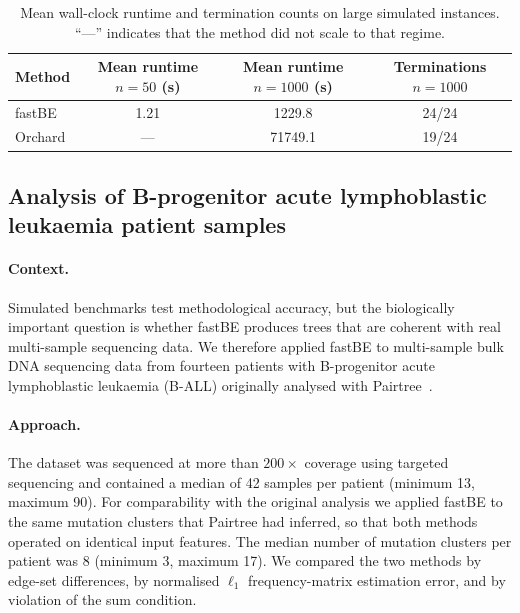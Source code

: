 \documentclass[11pt]{article}
\begin{document}
\begin{table}[htbp]
\centering
\caption{Mean wall-clock runtime and termination counts on large simulated instances. ``---'' indicates that the method did not scale to that regime.}
\label{tab:sim_runtime}
\begin{tabular}{lccc}
\toprule
Method & Mean runtime $n=50$ (s) & Mean runtime $n=1000$ (s) & Terminations $n=1000$ \\
\midrule
fastBE  & 1.21 & 1229.8  & 24/24 \\
Orchard & ---  & 71749.1 & 19/24 \\
\bottomrule
\end{tabular}
\end{table}

\subsection{Analysis of B-progenitor acute lymphoblastic leukaemia patient samples}

\paragraph{Context.}
Simulated benchmarks test methodological accuracy, but the biologically important question is whether fastBE produces trees that are coherent with real multi-sample sequencing data. We therefore applied fastBE to multi-sample bulk DNA sequencing data from fourteen patients with B-progenitor acute lymphoblastic leukaemia (B-ALL) originally analysed with Pairtree~\citep{wintersinger2022pairtree}.

\paragraph{Approach.}
The dataset was sequenced at more than $200\times$ coverage using targeted sequencing and contained a median of 42 samples per patient (minimum 13, maximum 90). For comparability with the original analysis we applied fastBE to the same mutation clusters that Pairtree had inferred, so that both methods operated on identical input features. The median number of mutation clusters per patient was 8 (minimum 3, maximum 17). We compared the two methods by edge-set differences, by normalised $\ell_1$ frequency-matrix estimation error, and by violation of the sum condition.
\end{document}
